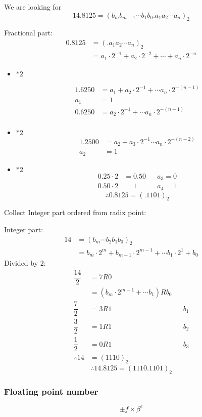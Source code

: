 \documentclass[10pt]{article}
\theoremstyle{definition}
\begin{document}
\begin{enumerate}
   We are looking for \[14.8125 = (b_mb_{m-1}\cdots b_1b_0.a_1a_2\cdots a_n)_2\]
   
   Fractional part: \begin{align*}
   0.8125&= (.a_1a_2\cdots a_n)_2\\
   &=a_1\cdot 2^{-1}+a_2\cdot 2^{-2}+\cdots +a_n\cdot 2^{-n}
   \end{align*}
   \begin{itemize}
   \item $*2$
   
   \begin{align*}
   1.6250&= a_1 + a_2\cdot 2^{-1}+ \cdots a_n \cdot 2^{-(n-1)}\\
   a_1 &=1\\
     0.6250&=  a_2\cdot 2^{-1}+ \cdots a_n \cdot 2^{-(n-1)}\\
   \end{align*}
\item $*2$
\begin{align*}
1.2500 &=  a_2+ a_3\cdot 2^{-1}\cdots a_n \cdot 2^{-(n-2)}\\
a_2&=1
\end{align*}
\item $*2$
\begin{align*}
0.25 \cdot 2 &= 0.50 && a_3=0\\
0.50 \cdot 2 &=1 &&a_4=1
\end{align*}
\[\therefore 0.8125 = (.1101)_2\]
   \end{itemize}
   Collect Integer part ordered from radix point:
   
   Integer part: \begin{align*}
   14 &= (b_m\cdots b_2b_1b_0)_2\\
   &=b_m \cdot 2^m + b_{m-1} \cdot 2^{m-1} + \cdots b_1\cdot 2^1 + b_0
   \end{align*}
Divided by 2: 
\begin{align*}
\dfrac{14}{2}&= 7 R 0\\
&= (b_m\cdot 2^{m-1}+\cdots b_1)R b_0\\
\dfrac{7}{2} &= 3 R 1 &&b_1\\
\dfrac{3}{2} &= 1 R 1 &&b_2\\
\dfrac{1}{2} &= 0 R 1 &&b_3\\
\therefore 14 &=(1110)_2
\end{align*}
\[\therefore 14.8125 = (1110.1101)_2\]
\end{enumerate}  
\subsubsection{Floating point number}
$$\pm f \times \beta^e$$  
\end{document}
